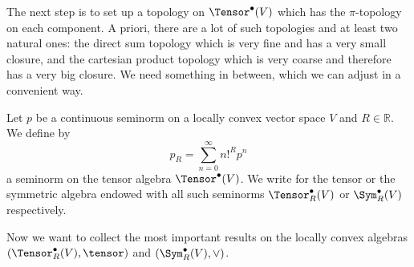 The next step is to set up a topology on $\Tensor^{\bullet}(V)$ which 
has the $\pi$-topology on each component. A priori, there are a lot of such 
topologies and at least two natural ones: the direct sum topology which is 
very fine and has a very small closure, and the cartesian product topology 
which is very coarse and therefore has a very big closure. We need something 
in between, which we can adjust in a convenient way.
\begin{definition}
	Let $p$ be a continuous seminorm on a locally convex vector space 
	$V$ and $R \in \mathbb{R}$. We define by 
	\begin{equation*}
		p_R 
		= 
		\sum\limits_{n=0}^{\infty}
		n!^R p^n
	\end{equation*}
	a seminorm on the tensor algebra $\Tensor^{\bullet}(V)$. We write for 
	the tensor or the symmetric algebra endowed with all such seminorms  
	$\Tensor_R^{\bullet}(V)$ or $\Sym_R^{\bullet}(V)$ respectively.
\end{definition}
Now we want to collect the most important results on the locally convex 
algebras $\left( \Tensor_R^{\bullet}(V), \tensor \right)$ and $\left( 
\Sym_R^{\bullet}(V), \vee \right)$. 
